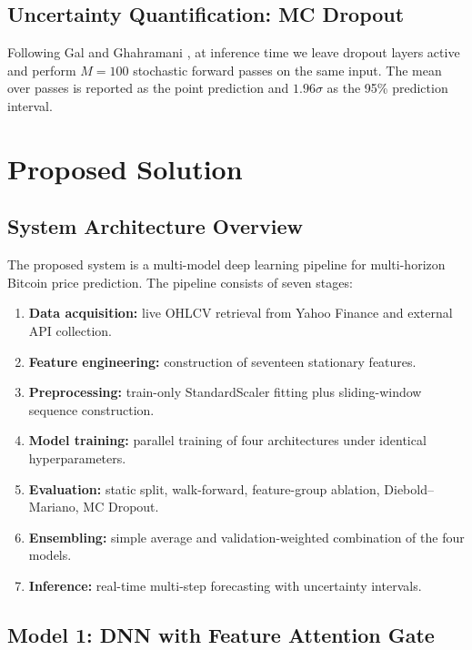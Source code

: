\documentclass[12pt]{article}
\begin{document}
\subsection{Uncertainty Quantification: MC Dropout}

Following Gal and Ghahramani \cite{galghahramani2016}, at inference time we leave dropout layers active and perform $M = 100$ stochastic forward passes on the same input. The mean over passes is reported as the point prediction and $1.96\sigma$ as the 95\% prediction interval.

\section{Proposed Solution}

\subsection{System Architecture Overview}

The proposed system is a multi-model deep learning pipeline for multi-horizon Bitcoin price prediction. The pipeline consists of seven stages:
\begin{enumerate}[leftmargin=*]
    \item \textbf{Data acquisition:} live OHLCV retrieval from Yahoo Finance and external API collection.
    \item \textbf{Feature engineering:} construction of seventeen stationary features.
    \item \textbf{Preprocessing:} train-only StandardScaler fitting plus sliding-window sequence construction.
    \item \textbf{Model training:} parallel training of four architectures under identical hyperparameters.
    \item \textbf{Evaluation:} static split, walk-forward, feature-group ablation, Diebold--Mariano, MC Dropout.
    \item \textbf{Ensembling:} simple average and validation-weighted combination of the four models.
    \item \textbf{Inference:} real-time multi-step forecasting with uncertainty intervals.
\end{enumerate}

\subsection{Model 1: DNN with Feature Attention Gate}
\end{document}
